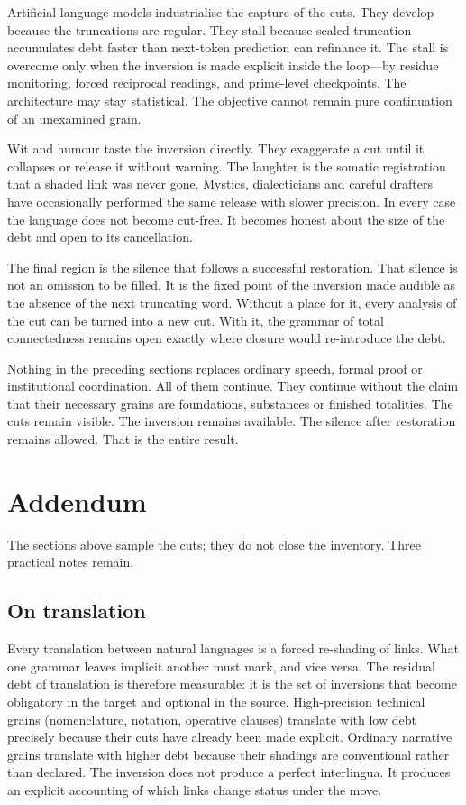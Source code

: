 \documentclass[11pt,a4paper]{article}
\begin{document}
Artificial language models industrialise the capture of the cuts. They develop because the truncations are regular. They stall because scaled truncation accumulates debt faster than next-token prediction can refinance it. The stall is overcome only when the inversion is made explicit inside the loop—by residue monitoring, forced reciprocal readings, and prime-level checkpoints. The architecture may stay statistical. The objective cannot remain pure continuation of an unexamined grain.

Wit and humour taste the inversion directly. They exaggerate a cut until it collapses or release it without warning. The laughter is the somatic registration that a shaded link was never gone. Mystics, dialecticians and careful drafters have occasionally performed the same release with slower precision. In every case the language does not become cut-free. It becomes honest about the size of the debt and open to its cancellation.

The final region is the silence that follows a successful restoration. That silence is not an omission to be filled. It is the fixed point of the inversion made audible as the absence of the next truncating word. Without a place for it, every analysis of the cut can be turned into a new cut. With it, the grammar of total connectedness remains open exactly where closure would re-introduce the debt.

Nothing in the preceding sections replaces ordinary speech, formal proof or institutional coordination. All of them continue. They continue without the claim that their necessary grains are foundations, substances or finished totalities. The cuts remain visible. The inversion remains available. The silence after restoration remains allowed. That is the entire result.

\section{Addendum}

The sections above sample the cuts; they do not close the inventory. Three practical notes remain.

\subsection{On translation} Every translation between natural languages is a forced re-shading of links. What one grammar leaves implicit another must mark, and vice versa. The residual debt of translation is therefore measurable: it is the set of inversions that become obligatory in the target and optional in the source. High-precision technical grains (nomenclature, notation, operative clauses) translate with low debt precisely because their cuts have already been made explicit. Ordinary narrative grains translate with higher debt because their shadings are conventional rather than declared. The inversion does not produce a perfect interlingua. It produces an explicit accounting of which links change status under the move.
\end{document}
